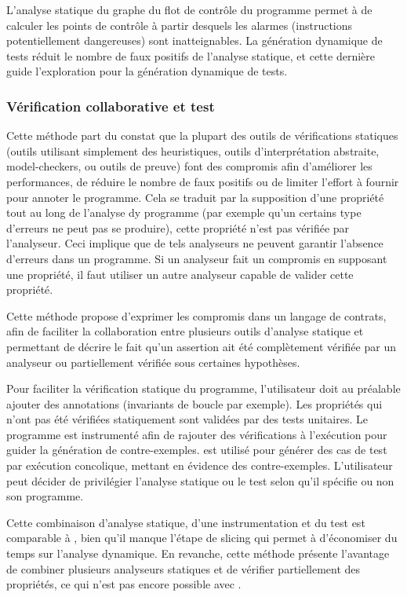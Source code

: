 L'analyse statique du graphe du flot de contrôle du programme permet à
\dyta de calculer les points de contrôle à partir desquels les alarmes
(instructions potentiellement dangereuses) sont inatteignables. La génération
dynamique de tests réduit le nombre de faux positifs de l'analyse statique, et
cette dernière guide l'exploration pour la génération dynamique de tests.

\subsubsection*{Vérification collaborative et test}

Cette méthode \cite{Christakis/FM12} part du constat que la plupart
des outils de vérifications statiques (outils utilisant simplement des
heuristiques, outils d'interprétation abstraite, model-checkers, ou outils de
preuve) font des compromis afin d'améliorer les performances, de réduire le
nombre de faux positifs ou de limiter l'effort à fournir pour annoter le
programme. Cela se traduit par la supposition d'une propriété tout au long de
l'analyse dy programme (par exemple qu'un certains type d'erreurs ne peut pas
se produire), cette propriété n'est pas vérifiée par l'analyseur. Ceci
implique que de tels analyseurs ne peuvent garantir l'absence d'erreurs dans un
programme. Si un analyseur fait un compromis en supposant une propriété, il
faut utiliser un autre analyseur capable de valider cette propriété.

Cette méthode propose d'exprimer les compromis dans un langage de contrats,
afin de faciliter la collaboration entre plusieurs outils d'analyse statique
et permettant de décrire le fait qu'un assertion ait été complètement vérifiée
par un analyseur ou partiellement vérifiée sous certaines hypothèses.

Pour faciliter la vérification statique du programme, l'utilisateur doit au
préalable ajouter des annotations (invariants de boucle par exemple). Les
propriétés qui n'ont pas été vérifiées statiquement sont validées par des tests
unitaires. Le programme est instrumenté afin de rajouter des vérifications à
l'exécution pour guider la génération de contre-exemples. \pex est utilisé pour
générer des cas de test par exécution concolique,
mettant en évidence des contre-exemples. L'utilisateur peut décider de
privilégier l'analyse statique ou le test selon qu'il spécifie ou non son
programme.

Cette combinaison d'analyse statique, d'une instrumentation et du test est
comparable à \sante, bien qu'il manque l'étape de slicing
qui permet à \sante d'économiser du temps sur l'analyse dynamique. En
revanche, cette méthode présente l'avantage de combiner plusieurs analyseurs
statiques et de vérifier partiellement des propriétés, ce qui n'est pas encore
possible avec \sante.

